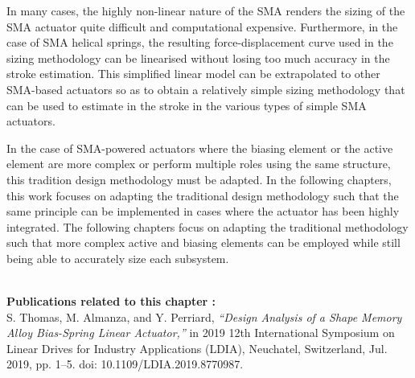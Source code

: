 In many cases, the highly non-linear nature of the SMA renders the sizing of the SMA actuator quite difficult and computational expensive. Furthermore, in the case of SMA helical springs, the resulting force-displacement curve used in the sizing methodology can be linearised without losing too much accuracy in the stroke estimation. This simplified linear model can be extrapolated to other SMA-based actuators so as to obtain a relatively simple sizing methodology that can be used to estimate in the stroke in the various types of simple SMA actuators.

In the case of SMA-powered actuators where the biasing element or the active element are more complex or perform multiple roles using the same structure, this tradition design methodology must be adapted. In the following chapters, this work focuses on adapting the traditional design methodology such that the same principle can be implemented in cases where the actuator has been highly integrated. The following chapters focus on adapting the traditional methodology such that more complex active and biasing elements can be employed while still being able to accurately size each subsystem.

\vspace*{\fill}
\noindent\hrulefill \\
\textbf{\large Publications related to this chapter :}\\

S. Thomas, M. Almanza, and Y. Perriard, \textit{“Design Analysis of a Shape Memory Alloy Bias-Spring Linear Actuator,”} in 2019 12th International Symposium on Linear Drives for Industry Applications (LDIA), Neuchatel, Switzerland, Jul. 2019, pp. 1–5. doi: 10.1109/LDIA.2019.8770987.
